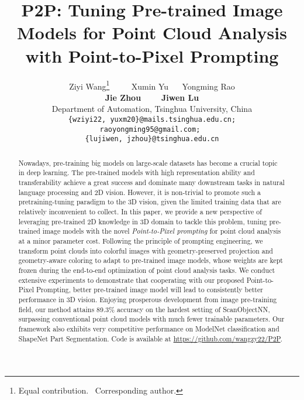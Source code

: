 \documentclass{article}
\begin{document}
\title{P2P: Tuning Pre-trained Image Models for Point Cloud Analysis with Point-to-Pixel Prompting}


\author{
    Ziyi Wang\thanks{Equal contribution. ~\textsuperscript{\dag}Corresponding author.} ~~~~
  	Xumin Yu ~~
	Yongming Rao \\
	\textbf{Jie Zhou ~~~
	Jiwen Lu}      \\
    Department of Automation, Tsinghua University, China\\
    {\tt\small \{wziyi22, yuxm20\}@mails.tsinghua.edu.cn;} \\{\tt\small raoyongming95@gmail.com; } \\
    {\tt\small \{lujiwen, jzhou\}@tsinghua.edu.cn} \\
}


\maketitle


\begin{abstract}
Nowadays, pre-training big models on large-scale datasets has become a crucial topic in deep learning. The pre-trained models with high representation ability and transferability achieve a great success and dominate many downstream tasks in natural language processing and 2D vision. However, it is non-trivial to promote such a pretraining-tuning paradigm to the 3D vision, given the limited training data that are relatively inconvenient to collect. In this paper, we provide a new perspective of leveraging pre-trained 2D knowledge in 3D domain to tackle this problem, tuning pre-trained image models with the novel \textit{Point-to-Pixel prompting} for point cloud analysis at a minor parameter cost. Following the principle of prompting engineering, we transform point clouds into colorful images with geometry-preserved projection and geometry-aware coloring to adapt to pre-trained image models, whose weights are kept frozen during the end-to-end optimization of point cloud analysis tasks. 
We conduct extensive experiments to demonstrate that cooperating with our proposed Point-to-Pixel Prompting, better pre-trained image model will lead to consistently better performance in 3D vision. Enjoying prosperous development from image pre-training field, our method attains 89.3\% accuracy on the hardest setting of ScanObjectNN, surpassing conventional point cloud models with much fewer trainable parameters. Our framework also exhibits very competitive performance on ModelNet classification and ShapeNet Part Segmentation. Code is available at \url{https://github.com/wangzy22/P2P}.
\end{abstract}
\end{document}
